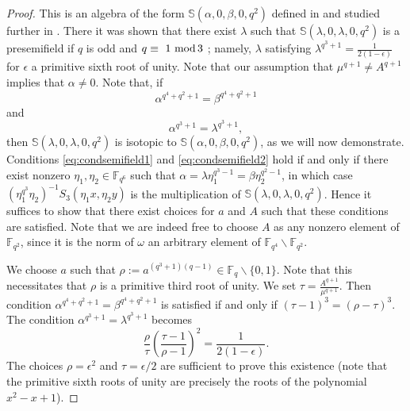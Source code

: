 \documentclass[11pt]{amsart}
\theoremstyle{definition}
\newcommand{\F}{{\mathbb F}}
\newcommand{\Fq}{{\mathbb F}_{q}}
\renewcommand{\mod}{\hbox{{\rm mod}\,}}
\newcommand{\N}{\mathrm{N}}
\begin{document}
\begin{proof}
This is an algebra of the form $\mathbb{S}(\alpha,0,\beta,0,q^2)$ defined in \cite{marino2011towards} and studied further in \cite{lavrauw2011fq}. There it was shown that there exist $\lambda$ such that $\mathbb{S}(\lambda,0,\lambda,0,q^2)$ is a presemifield if $q$ is odd and $q\equiv~ 1~ \mod 3$ \cite[Theorem 5.3]{lavrauw2011fq}; namely, $\lambda$ satisfying $\lambda^{q^3+1}= \frac{1}{2(1-\epsilon)}$ for $\epsilon$ a primitive sixth root of unity. %
Note that our assumption that $\mu^{q+1}\ne A^{q+1}$ implies that $\alpha\ne 0$.
Note that, if 
\begin{equation} \label{eq:condsemifield1}
\alpha^{q^4+q^2+1}=\beta^{q^4+q^2+1}
\end{equation}
 and 
 \begin{equation} \label{eq:condsemifield2}
     \alpha^{q^3+1}=\lambda^{q^3+1},
 \end{equation}
 then $\mathbb{S}(\lambda,0,\lambda,0,q^2)$ is isotopic to $\mathbb{S}(\alpha,0, \beta,0,q^2)$, as we will now demonstrate.
Conditions \eqref{eq:condsemifield1} and \eqref{eq:condsemifield2} hold if and only if there exist nonzero $\eta_1,\eta_2\in \F_{q^6}$ such that $\alpha=\lambda \eta_1^{q^3-1}=\beta \eta_2^{q^2-1}$, in which case $(\eta_1^{q^3}\eta_2)^{-1} S_3(\eta_1 x,\eta_2 y)$ is the multiplication of $\mathbb{S}(\lambda,0,\lambda,0,q^2)$. Hence it suffices to show that there exist choices for $a$ and $A$ such that these conditions are satisfied. Note that we are indeed free to choose $A$ as any nonzero element of $\F_{q^2}$, since it is the norm of $\omega$ an arbitrary element of $\F_{q^4}\backslash\F_{q^2}$.

We choose $a$ such that $\rho := a^{(q^3+1)(q-1)}\in\Fq\backslash\{0,1\}$. Note that this necessitates that $\rho$ is a primitive third root of unity. We set $\tau= \frac{A^{q+1}}{\mu^{q+1}}$. Then condition $\alpha^{q^4+q^2+1}=\beta^{q^4+q^2+1}$ is satisfied if and only if $(\tau-1)^3=(\rho-\tau)^3$.
 The condition $\alpha^{q^3+1}=\lambda^{q^3+1}$ becomes
\[
\frac{\rho}{\tau}\left(\frac{\tau-1}{\rho-1}\right)^2 = \frac{1}{2(1-\epsilon)}.
\]
The choices $\rho=\epsilon^2$ and $\tau = \epsilon/2$ are sufficient to prove this existence (note that the primitive sixth roots of unity are precisely the roots of the polynomial $x^2-x+1$).


\end{proof}
\end{document}
